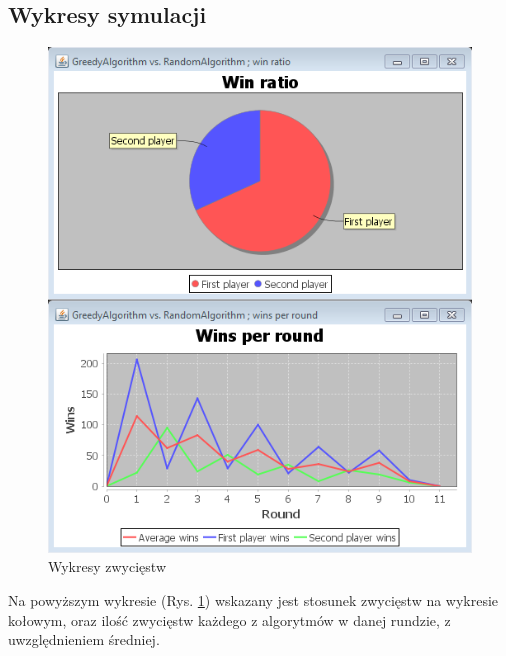 \subsection*{Wykresy symulacji}
\begin{figure}[H]
	\centering
	\includegraphics[]{Resources/winCharts.PNG}
	\caption{Wykresy zwycięstw} 
	\label{fig:winChart}
\end{figure}

Na powyższym wykresie (Rys. \ref{fig:winChart}) wskazany jest stosunek zwycięstw na wykresie kołowym, oraz ilość zwycięstw każdego z algorytmów w danej rundzie, z uwzględnieniem średniej.

